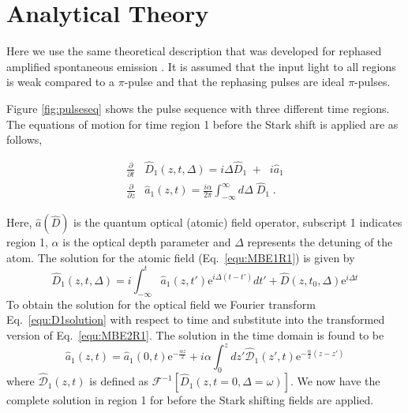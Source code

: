 \documentclass[superscriptaddress,pra,twocolumn,showpacs,amsmath,amssymb,aps,a4paper]{revtex4}
\begin{document}
\section{Analytical Theory}

Here we use the same theoretical description that was developed for rephased
amplified spontaneous emission \cite{ledi10}. It is assumed that the input
light to all regions is weak compared to a $\pi$-pulse and that the
rephasing pulses are ideal $\pi$-pulses.

Figure \ref{fig:pulseseq} shows the pulse sequence with three different
time regions. The equations of motion for time region 1 before the
Stark shift is applied are as follows,

\begin{subequations}
 \label{equ:groundMBE}
 \begin{align}
  \label{equ:MBE1R1}
  \frac{\partial}{\partial t} & \hat{D}_{1 }(z,t,\Delta) = i \Delta \hat{D}_{1} \; +  \;\; i \hat{a}_{1} \\
  \label{equ:MBE2R1}
  \frac{\partial}{\partial z} & \hat{a}_{1}(z,t) = \frac{i \alpha}{2 \pi} \int_{-\infty}^{\infty} d\Delta \;   \hat{D}_{1} \;.
 \end{align}
 \end{subequations}

 Here, $\hat{a} (\hat{D})$ is the quantum optical (atomic) field
 operator, subscript 1 indicates region 1, $\alpha$ is the optical
 depth parameter and $\Delta$ represents the detuning of the
 atom. The solution for the
 atomic field (Eq.~\ref{equ:MBE1R1}) is given by
\begin{equation}
\hat{D}_1(z,t,\Delta) = i \int^{t}_{-\infty} \hat{a}_1(z,t') \text{e}^{i\Delta (t-t')} dt' + \hat{D}(z,t_0,\Delta)\text{e}^{i\Delta t }\label{equ:D1solution}
\end{equation}
To obtain the solution for the optical field we Fourier transform
Eq.~\ref{equ:D1solution} with respect to time and substitute into the
transformed version of Eq.~\ref{equ:MBE2R1}. The solution in the time
domain is found to be
\begin{equation}
\hat{a}_1(z,t) = \hat{a}_1(0,t)\text{e}^{-\frac{\alpha z}{2}} +
i\alpha \int^z_0 dz' \hat{\mathcal{D}}_1(z',t)\text{e}^{-\frac{\alpha}{2}(z-z')}\label{equ:a1solution}
\end{equation}
where $\hat{\mathcal{D}}_1(z,t)$ is defined as
$\mathcal{F}^{-1}\left[\hat{D}_1(z,t = 0,\Delta=\omega)\right]$. We now have
the complete solution in region 1 for before the Stark shifting fields
are applied.
\end{document}
